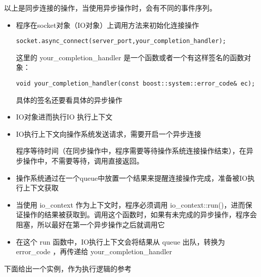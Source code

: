 以上是同步连接的操作，当使用异步操作时，会有不同的事件序列。

\begin{itemize}
	\item 程序在socket对象（IO对象）上调用方法来初始化连接操作
	\begin{lstlisting}[frame=shadowbox]
socket.async_connect(server_port,your_completion_handler);
	\end{lstlisting}
	这里的 your\_completion\_handler 是一个函数或者一个有这样签名的函数对象：
	\begin{lstlisting}[frame=shadowbox]
void your_completion_handler(const boost::system::error_code& ec);
	\end{lstlisting}
	具体的签名还要看具体的异步操作
	\item IO对象进而执行IO 执行上下文
	\item IO执行上下文向操作系统发送请求，需要开启一个异步连接
	
	程序等待时间（在同步操作中，程序需要等待操作系统连接操作结束），在异步操作中，不需要等待，调用直接返回。
	
	\item 操作系统通过在一个queue中放置一个结果来提醒连接操作完成，准备被IO执行上下文获取
	\item 当使用 io\_context 作为上下文时，程序必须调用 io\_context::run()，进而保证操作的结果被获取到。调用这个函数时，如果有未完成的异步操作，程序会阻塞，所以最好在第一个异步操作之后就调用它
	\item 在这个 run 函数中，IO执行上下文会将结果从 queue 出队，转换为 error\_code ，再传递给 your\_completion\_handler
\end{itemize}
\newpage
下面给出一个实例，作为执行逻辑的参考
